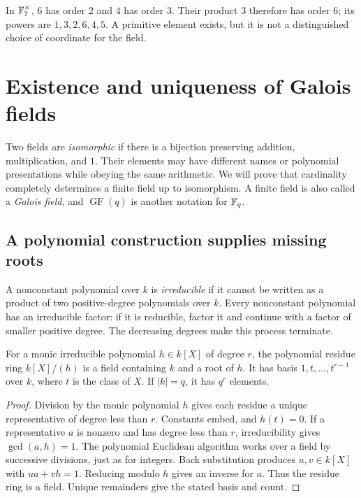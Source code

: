\begin{example}
In $\mathbb F_7^\times$, $6$ has order $2$ and $4$ has order $3$.
Their product $3$ therefore has order $6$; its powers are
$1,3,2,6,4,5$. A primitive element exists, but it is not a
distinguished choice of coordinate for the field.
\end{example}

\section{Existence and uniqueness of Galois fields}
\label{sec:finite-field-classification}

Two fields are \emph{isomorphic} if there is a bijection preserving
addition, multiplication, and $1$. Their elements may have different
names or polynomial presentations while obeying the same arithmetic.
We will prove that cardinality completely determines a finite field
up to isomorphism. A finite field is also called a \emph{Galois field},
and $\operatorname{GF}(q)$ is another notation for $\mathbb F_q$.

\subsection*{A polynomial construction supplies missing roots}

A nonconstant polynomial over $k$ is \emph{irreducible} if it cannot
be written as a product of two positive-degree polynomials over $k$.
Every nonconstant polynomial has an irreducible factor: if it is
reducible, factor it and continue with a factor of smaller positive
degree. The decreasing degrees make this process terminate.

\begin{lemma}
\label{lem:adjoin-finite-root}
For a monic irreducible polynomial $h\in k[X]$ of degree $r$, the
polynomial residue ring $k[X]/(h)$ is a field containing $k$ and a
root of $h$. It has basis $1,t,\ldots,t^{r-1}$ over $k$, where $t$
is the class of $X$. If $|k|=q$, it has $q^r$ elements.
\end{lemma}
\begin{proof}
Division by the monic polynomial $h$ gives each residue a unique
representative of degree less than $r$. Constants embed, and $h(t)=0$.
If a representative $a$ is nonzero and has degree less than $r$,
irreducibility gives $\gcd(a,h)=1$. The polynomial Euclidean algorithm
works over a field by successive divisions, just as for integers.
Back substitution produces $u,v\in k[X]$ with $ua+vh=1$.
Reducing modulo $h$ gives an inverse for $a$. Thus the residue ring
is a field. Unique remainders give the stated basis and count.
\end{proof}

